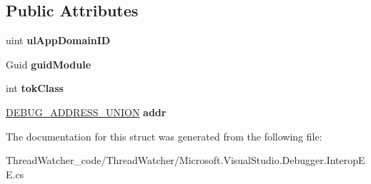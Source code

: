 \subsection*{Public Attributes}
\begin{DoxyCompactItemize}
\item 
\hypertarget{struct_microsoft_1_1_visual_studio_1_1_debugger_1_1_interop_e_e_1_1_d_e_b_u_g___a_d_d_r_e_s_s_a4161da080253a72821a06d51b4421ec8}{uint {\bfseries ul\+App\+Domain\+I\+D}}\label{struct_microsoft_1_1_visual_studio_1_1_debugger_1_1_interop_e_e_1_1_d_e_b_u_g___a_d_d_r_e_s_s_a4161da080253a72821a06d51b4421ec8}

\item 
\hypertarget{struct_microsoft_1_1_visual_studio_1_1_debugger_1_1_interop_e_e_1_1_d_e_b_u_g___a_d_d_r_e_s_s_aebb72b73aceca128b87636924d06d4e8}{Guid {\bfseries guid\+Module}}\label{struct_microsoft_1_1_visual_studio_1_1_debugger_1_1_interop_e_e_1_1_d_e_b_u_g___a_d_d_r_e_s_s_aebb72b73aceca128b87636924d06d4e8}

\item 
\hypertarget{struct_microsoft_1_1_visual_studio_1_1_debugger_1_1_interop_e_e_1_1_d_e_b_u_g___a_d_d_r_e_s_s_a5ace2e1b9325fc80cc4e6ce23a86fba6}{int {\bfseries tok\+Class}}\label{struct_microsoft_1_1_visual_studio_1_1_debugger_1_1_interop_e_e_1_1_d_e_b_u_g___a_d_d_r_e_s_s_a5ace2e1b9325fc80cc4e6ce23a86fba6}

\item 
\hypertarget{struct_microsoft_1_1_visual_studio_1_1_debugger_1_1_interop_e_e_1_1_d_e_b_u_g___a_d_d_r_e_s_s_ae9c04b8b340665b7cf7b4fdeaa43bc27}{\hyperlink{struct_microsoft_1_1_visual_studio_1_1_debugger_1_1_interop_e_e_1_1_d_e_b_u_g___a_d_d_r_e_s_s___u_n_i_o_n}{D\+E\+B\+U\+G\+\_\+\+A\+D\+D\+R\+E\+S\+S\+\_\+\+U\+N\+I\+O\+N} {\bfseries addr}}\label{struct_microsoft_1_1_visual_studio_1_1_debugger_1_1_interop_e_e_1_1_d_e_b_u_g___a_d_d_r_e_s_s_ae9c04b8b340665b7cf7b4fdeaa43bc27}

\end{DoxyCompactItemize}


The documentation for this struct was generated from the following file\+:\begin{DoxyCompactItemize}
\item 
Thread\+Watcher\+\_\+code/\+Thread\+Watcher/Microsoft.\+Visual\+Studio.\+Debugger.\+Interop\+E\+E.\+cs\end{DoxyCompactItemize}
